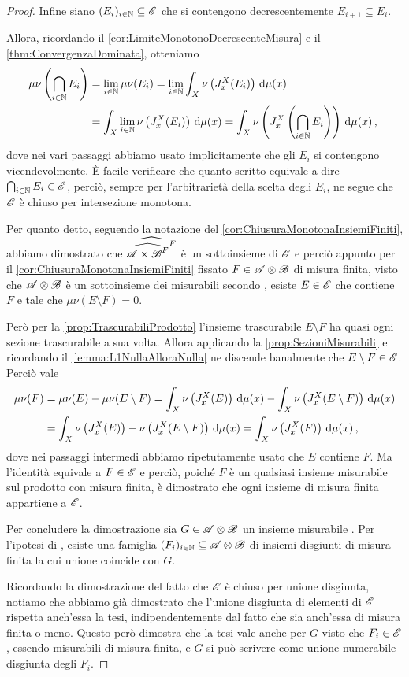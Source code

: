 \begin{proof}
	Infine siano $(E_i)_{i\in\mathbb N}\subseteq \mathscr E$ che si contengono decrescentemente $E_{i+1}\subseteq E_i$.
	
	Allora, ricordando il \cref{cor:LimiteMonotonoDecrescenteMisura} e il \cref{thm:ConvergenzaDominata}, otteniamo
	\begin{align*}
		\mu\nu\left(\bigcap_{i\in\mathbb N}E_i\right)&=\lim_{i\in\mathbb N}\mu\nu(E_i)=
		\lim_{i\in\mathbb N}\int_X\nu\left(J_x^X(E_i)\right)\,\mathrm d\mu(x)\\
		&=\int_X\lim_{i\in\mathbb N}\nu\left(J_x^X(E_i)\right)\,\mathrm d\mu(x)=
		\int_X\nu\left(J_x^X\left(\bigcap_{i\in\mathbb N}E_i\right)\right)\,\mathrm d\mu(x)\, \text{, }
	\end{align*}
	dove nei vari passaggi abbiamo usato implicitamente che gli $E_i$ si contengono vicendevolmente.
	È facile verificare che quanto scritto equivale a dire $\bigcap_{i\in\mathbb N}E_i\in\mathscr E$, perciò, sempre per l'arbitrarietà della scelta degli $E_i$, ne segue che $\mathscr E$ è chiuso per intersezione monotona.
	
	Per quanto detto, seguendo la notazione del \cref{cor:ChiusuraMonotonaInsiemiFiniti}, abbiamo dimostrato che $\widehat{\widehat{{\mathscr A\times\mathscr B}^F}^F}$ è un sottoinsieme di $\mathscr E$ e perciò appunto per il \cref{cor:ChiusuraMonotonaInsiemiFiniti} fissato $F\in\mathscr A\otimes\mathscr B$ di misura finita, visto che $\mathscr A\otimes\mathscr B$ è un sottoinsieme dei misurabili secondo \carat{}, esiste $E\in\mathscr E$ che contiene $F$ e tale che $\mu\nu(E\setminus F)=0$. 
	
	Però per la \cref{prop:TrascurabiliProdotto} l'insieme trascurabile $E\setminus F$ ha quasi ogni sezione trascurabile a sua volta.
	Allora applicando la \cref{prop:SezioniMisurabili} e ricordando il \cref{lemma:L1NullaAlloraNulla} ne discende banalmente che $E\setminus F\in\mathscr E$.
	Perciò vale
	\begin{align*}
		\mu\nu(F)&=\mu\nu(E)-\mu\nu(E\setminus F)=\int_X\nu\left(J_x^X(E)\right)\,\mathrm d\mu(x)-\int_X\nu\left(J_x^X(E\setminus F)\right)\,\mathrm d\mu(x)\\
		&=\int_X \nu\left(J_x^X(E)\right)-\nu\left(J_x^X(E\setminus F)\right)\,\mathrm d\mu(x)
		=\int_X\nu\left(J_x^X(F)\right)\,\mathrm d\mu(x)\, \text{, }
	\end{align*}
	dove nei passaggi intermedi abbiamo ripetutamente usato che $E$ contiene $F$.
	Ma l'identità equivale a $F\in\mathscr E$ e perciò, poiché $F$ è un qualsiasi insieme misurabile sul prodotto con misura finita, è dimostrato che ogni insieme di misura finita appartiene a $\mathscr E$.
	
	Per concludere la dimostrazione sia $G\in\mathscr A\otimes\mathscr B$ un insieme misurabile \sigfin[o]. Per l'ipotesi di \sigfin[ezza], esiste una famiglia $(F_i)_{i\in\mathbb N}\subseteq \mathscr A\otimes\mathscr B$ di insiemi disgiunti di misura finita la cui unione coincide con $G$.
	
	Ricordando la dimostrazione del fatto che $\mathscr E$ è chiuso per unione disgiunta, notiamo che abbiamo già dimostrato che l'unione disgiunta di elementi di $\mathscr E$ rispetta anch'essa la tesi, indipendentemente dal fatto che sia anch'essa di misura finita o meno. Questo però dimostra che la tesi vale anche per $G$ visto che $F_i\in\mathscr E$, essendo misurabili di misura finita, e $G$ si può scrivere come unione numerabile disgiunta degli $F_i$. 
\end{proof}

